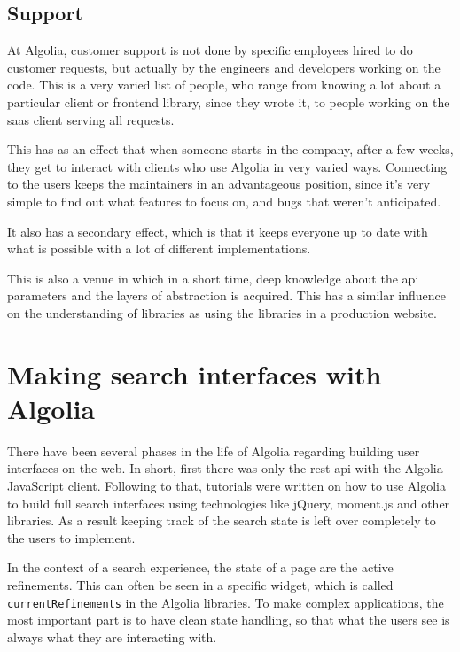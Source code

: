 \subsection{Support}
\label{support}

At Algolia, customer support is not done by specific employees hired to do customer requests, but actually by the engineers and developers working on the code. This is a very varied list of people, who range from knowing a lot about a particular client or frontend \gls{library}, since they wrote it, to people working on the \gls{saas} client serving all requests.

This has as an effect that when someone starts in the company, after a few weeks, they get to interact with clients who use Algolia in very varied ways. Connecting to the users keeps the maintainers in an advantageous position, since it's very simple to find out what features to focus on, and bugs that weren't anticipated.

It also has a secondary effect, which is that it keeps everyone up to date with what is possible with a lot of different implementations.

This is also a venue in which in a short time, deep knowledge about the \acrshort{api} parameters and the layers of abstraction is acquired. This has a similar influence on the understanding of libraries as using the libraries in a production website.

\section{Making search interfaces with Algolia} %
\label{sec:making_search_interfaces_with_algolia}

There have been several phases in the life of Algolia regarding building user interfaces on the web. In short, first there was only the \acrshort{rest} \acrshort{api} with the Algolia JavaScript client. Following to that, tutorials were written on how to use Algolia to build full search interfaces using technologies like jQuery, moment.js and other libraries. As a result keeping track of the search state is left over completely to the users to implement.

In the context of a search experience, the state of a page are the active refinements. This can often be seen in a specific widget, which is called {\tt currentRefinements} in the Algolia libraries. To make complex applications, the most important part is to have clean state handling, so that what the users see is always what they are interacting with.


